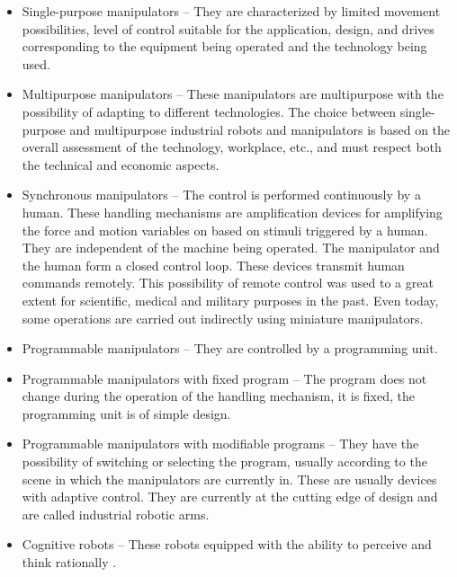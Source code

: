 \begin{itemize}

    \item  Single-purpose manipulators -- They are characterized by limited movement possibilities, level of control suitable for the application, design, and drives corresponding to the equipment being operated and the technology being used.

    \item Multipurpose manipulators -- These manipulators are multipurpose with the possibility of adapting to different technologies. The choice between single-purpose and multipurpose industrial robots and manipulators is based on the overall assessment of the technology, workplace, etc., and must respect both the technical and economic aspects.

    \item  Synchronous manipulators -- The control is performed continuously by a human. These handling mechanisms are amplification devices for amplifying the force and motion variables on based on stimuli triggered by a human. They are independent of the machine being operated. The manipulator and the human form a closed control loop. These devices transmit human commands remotely. This possibility of remote control was used to a great extent for scientific, medical and military purposes in the past. Even today, some operations are carried out indirectly using miniature manipulators. 

    \item  Programmable manipulators -- They are controlled by a programming unit.

    \item  Programmable manipulators with fixed program -- The program does not change during the operation of the handling mechanism, it is fixed, the programming unit is of simple design.

    \item  Programmable manipulators with modifiable programs -- They have the possibility of switching or selecting the program, usually according to the scene in which the manipulators are currently in. These are usually devices with adaptive control. They are currently at the cutting edge of design and are called industrial robotic arms.

    \item  Cognitive robots -- These robots equipped with the ability to perceive and think rationally \cite{vsb_2007}.

\end{itemize}


